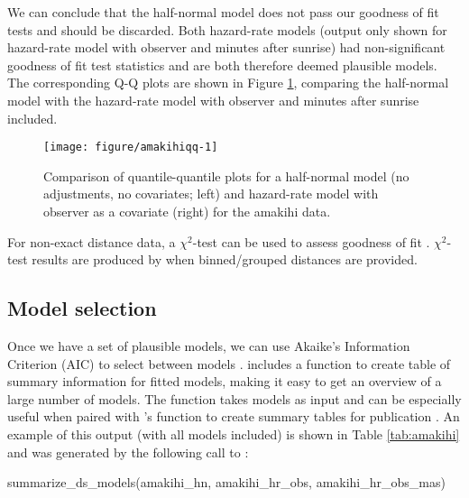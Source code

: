 \documentclass[article]{jss}\usepackage[]{graphicx}\usepackage[]{color}
\makeatletter
\def\maxwidth{ %
  \ifdim\Gin@nat@width>\linewidth
    \linewidth
  \else
    \Gin@nat@width
  \fi
}
\makeatother
\begin{document}
We can conclude that the half-normal model does not pass our goodness of fit tests and should be discarded. Both hazard-rate models (output only shown for hazard-rate model with observer and minutes after sunrise) had non-significant goodness of fit test statistics and are both therefore deemed plausible models. The corresponding Q-Q plots are shown in Figure \ref{amakihi-qq}, comparing the half-normal model with the hazard-rate model with observer and minutes after sunrise included.

\begin{figure}
\begin{center}
\begin{Schunk}

\texttt{[image: figure/amakihiqq-1]} \end{Schunk}
\caption{Comparison of quantile-quantile plots for a half-normal model (no adjustments, no covariates; left) and hazard-rate model with observer as a covariate (right) for the amakihi data.}
\label{amakihi-qq}
\end{center}
\end{figure}

For non-exact distance data, a $\chi^2$-test can be used to assess goodness of fit \citep[see][Section 3.4.4]{Buckland:2001vm}. $\chi^2$-test results are produced by  when binned/grouped distances are provided.

\subsection{Model selection}

Once we have a set of plausible models, we can use Akaike's Information Criterion (AIC) to select between models \citep[see e.g.][]{burnham2003model}.  includes a function to create table of summary information for fitted models, making it easy to get an overview of a large number of models. The  function takes models as input and can be especially useful when paired with 's  function to create summary tables for publication \citep{knitr-pkg}. An example of this output (with all models included) is shown in Table \ref{tab:amakihi} and was generated by the following call to :

\begin{Code}
summarize_ds_models(amakihi_hn, amakihi_hr_obs, amakihi_hr_obs_mas)
\end{Code}
\end{document}
